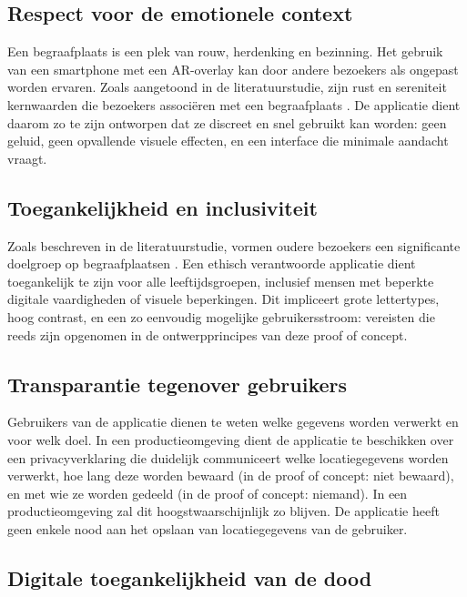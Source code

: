 \subsection{Respect voor de emotionele context}

Een begraafplaats is een plek van rouw, herdenking en bezinning. Het gebruik van een smartphone met een AR-overlay kan door andere bezoekers als ongepast worden ervaren. Zoals aangetoond in de literatuurstudie, zijn rust en sereniteit kernwaarden die bezoekers associëren met een begraafplaats \autocite{Haekkilae2022}. De applicatie dient daarom zo te zijn ontworpen dat ze discreet en snel gebruikt kan worden: geen geluid, geen opvallende visuele effecten, en een interface die minimale aandacht vraagt.

\subsection{Toegankelijkheid en inclusiviteit}

Zoals beschreven in de literatuurstudie, vormen oudere bezoekers een significante doelgroep op begraafplaatsen \autocite{Haekkilae2022}. Een ethisch verantwoorde applicatie dient toegankelijk te zijn voor alle leeftijdsgroepen, inclusief mensen met beperkte digitale vaardigheden of visuele beperkingen. Dit impliceert grote lettertypes, hoog contrast, en een zo eenvoudig mogelijke gebruikersstroom: vereisten die reeds zijn opgenomen in de ontwerpprincipes van deze proof of concept.

\subsection{Transparantie tegenover gebruikers}

Gebruikers van de applicatie dienen te weten welke gegevens worden verwerkt en voor welk doel. In een productieomgeving dient de applicatie te beschikken over een privacyverklaring die duidelijk communiceert welke locatiegegevens worden verwerkt, hoe lang deze worden bewaard (in de proof of concept: niet bewaard), en met wie ze worden gedeeld (in de proof of concept: niemand). In een productieomgeving zal dit hoogstwaarschijnlijk zo blijven. De applicatie heeft geen enkele nood aan het opslaan van locatiegegevens van de gebruiker.

\subsection{Digitale toegankelijkheid van de dood}

